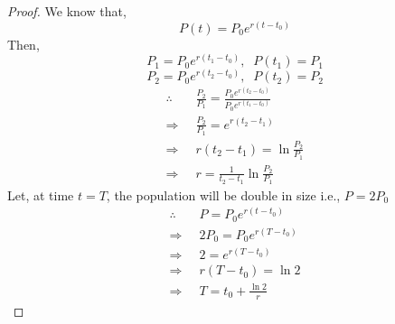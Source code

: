 \documentclass[../main-sheet.tex]{subfiles}
\begin{document}
\begin{proof}
    We know that,
    \[P(t)=P_0e^{r(t-t_0)}\]
    Then, 
    \[
        P_1=P_0e^{r(t_1-t_0)}, \;\;P(t_1)=P_1
    \]
    \[
        P_2=P_0e^{r(t_2-t_0)}, \;\;P(t_2)=P_2
    \]
    \begin{align*}
        \therefore\;\;&\frac{P_2}{P_1}=\frac{P_0e^{r(t_2-t_0)}}{P_0e^{r(t_1-t_0)}}\\
        \Rightarrow\;\;&\frac{P_2}{P_1}=e^{r(t_2-t_1)}\\
        \Rightarrow\;\;&r(t_2-t_1)=\ln\frac{P_2}{P_1}\\
        \Rightarrow\;\;&r=\frac{1}{t_2-t_1}\ln\frac{P_2}{P_1}
    \end{align*}
    Let, at time \(t=T\), the population will be double in size i.e., \(P=2P_0\)
    \begin{align*}
        \therefore\;\;&P=P_0e^{r(t-t_0)}\\
        \Rightarrow\;\;&2P_0=P_0e^{r(T-t_0)}\\
        \Rightarrow\;\;&2=e^{r(T-t_0)}\\
        \Rightarrow\;\;&{r(T-t_0)}=\ln 2\\
        \Rightarrow\;\;&T=t_0+\frac{\ln 2}{r}
    \end{align*}
\end{proof}
\end{document}
